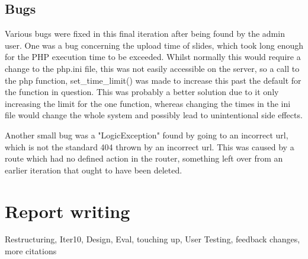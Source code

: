 \documentclass{article}
\begin{document}
\subsection{Bugs}
Various bugs were fixed in this final iteration after being found by the admin user. One was a bug concerning the upload time of slides, which took long enough for the PHP execution time to be exceeded. Whilst normally this would require a change to the php.ini file, this was not easily accessible on the server, so a call to the php function, set\_time\_limit() was made to increase this past the default for the function in question. This was probably a better solution due to it only increasing the limit for the one function, whereas changing the times in the ini file would change the whole system and possibly lead to unintentional side effects.

Another small bug was a "LogicException" found by going to an incorrect url, which is not the standard 404 thrown by an incorrect url. This was caused by a route which had no defined action in the router, something left over from an earlier iteration that ought to have been deleted.

\section{Report writing}
Restructuring, Iter10, Design, Eval, touching up, User Testing, feedback changes, more citations
\newpage


%
%
\end{document}
